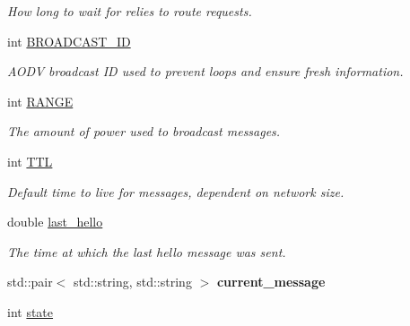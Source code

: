 \begin{DoxyCompactItemize}
\begin{DoxyCompactList}\small\item\em How long to wait for relies to route requests. \end{DoxyCompactList}\item 
int \hyperlink{class_aodv_ab93874fa41ef9af73418d214ccd466d2}{B\+R\+O\+A\+D\+C\+A\+S\+T\+\_\+\+ID}\hypertarget{class_aodv_ab93874fa41ef9af73418d214ccd466d2}{}\label{class_aodv_ab93874fa41ef9af73418d214ccd466d2}

\begin{DoxyCompactList}\small\item\em A\+O\+DV broadcast ID used to prevent loops and ensure fresh information. \end{DoxyCompactList}\item 
int \hyperlink{class_aodv_ac38532f60d01588244590f67a26ec444}{R\+A\+N\+GE}\hypertarget{class_aodv_ac38532f60d01588244590f67a26ec444}{}\label{class_aodv_ac38532f60d01588244590f67a26ec444}

\begin{DoxyCompactList}\small\item\em The amount of power used to broadcast messages. \end{DoxyCompactList}\item 
int \hyperlink{class_aodv_ae913ca4851a83972a6b2adcec001265a}{T\+TL}\hypertarget{class_aodv_ae913ca4851a83972a6b2adcec001265a}{}\label{class_aodv_ae913ca4851a83972a6b2adcec001265a}

\begin{DoxyCompactList}\small\item\em Default time to live for messages, dependent on network size. \end{DoxyCompactList}\item 
double \hyperlink{class_aodv_aad3ee31d3d30438ccfc4cd56f88e722c}{last\+\_\+hello}\hypertarget{class_aodv_aad3ee31d3d30438ccfc4cd56f88e722c}{}\label{class_aodv_aad3ee31d3d30438ccfc4cd56f88e722c}

\begin{DoxyCompactList}\small\item\em The time at which the last hello message was sent. \end{DoxyCompactList}\item 
std\+::pair$<$ std\+::string, std\+::string $>$ {\bfseries current\+\_\+message}\hypertarget{class_aodv_af150c2358b1a78383eb889533576c842}{}\label{class_aodv_af150c2358b1a78383eb889533576c842}

\item 
int \hyperlink{class_aodv_a2a4294d0e2a5deb2eb4638bfdf6acf05}{state}\hypertarget{class_aodv_a2a4294d0e2a5deb2eb4638bfdf6acf05}{}\label{class_aodv_a2a4294d0e2a5deb2eb4638bfdf6acf05}


\end{DoxyCompactItemize}
